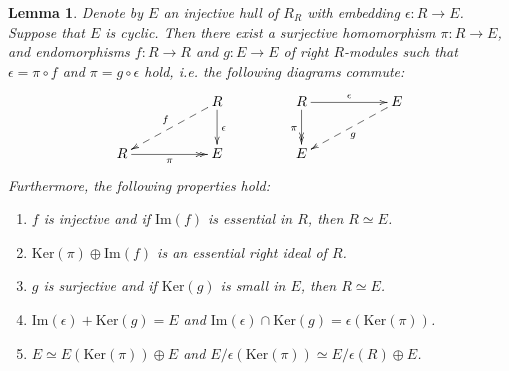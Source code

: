 \documentclass{amsart}
\theoremstyle{plain}
\newtheorem{lemma}[theorem]{Lemma}
\numberwithin{equation}{section}
\begin{document}
\begin{lemma}
\label{Basic Lemma I} Denote by $E$ an injective hull of $R_{R}$ with embedding $\epsilon  :R \rightarrow E$. Suppose that $E$ is cyclic. Then there exist a surjective homomorphism $\pi  :R \rightarrow E$, and endomorphisms $f :R \rightarrow R$ and $g :E \rightarrow E$ of right $R$-modules such that $\epsilon  =\pi  \circ f$ and $\pi  =g \circ \epsilon $ hold, i.e. the following diagrams commute:
\begin{equation*}
\xymatrix { & &R\ar @{->}[d]^\epsilon \ar @{-->}[lld]_f\\ R \ar @{->>}[rr]_{\pi } && E }
\text{\quad \quad \quad \quad }
\xymatrix { R \ar @{->}[rr]^{\epsilon }\ar @{->>}[d]_\pi && E \ar @{-->}[lld]^{g}\\ E }
\end{equation*}Furthermore, the following properties hold: 


\begin{enumerate}
\item $f$ is injective and if $\mathrm{I} \mathrm{m} (f)$ is essential in $R$, then $R \simeq E$. 

\item $\mathrm{K} \mathrm{e} \mathrm{r} (\pi ) \oplus \mathrm{I} \mathrm{m} (f)$ is an essential right ideal of $R$. 

\item $g$ is surjective and if $\mathrm{K} \mathrm{e} \mathrm{r} (g)$ is small in $E$, then $R \simeq E$. 

\item $\mathrm{I} \mathrm{m} (\epsilon ) +\mathrm{K} \mathrm{e} \mathrm{r} (g) =E$ and $\mathrm{I} \mathrm{m} (\epsilon ) \cap \mathrm{K} \mathrm{e} \mathrm{r} (g) =\epsilon  (\mathrm{K} \mathrm{e} \mathrm{r} (\pi ))$. 

\item $E \simeq E (\mathrm{K} \mathrm{e} \mathrm{r} (\pi )) \oplus E$ and $E/\epsilon  (\mathrm{K} \mathrm{e} \mathrm{r} (\pi )) \simeq E/\epsilon  (R) \oplus E$. \end{enumerate}
\end{lemma}
\end{document}
